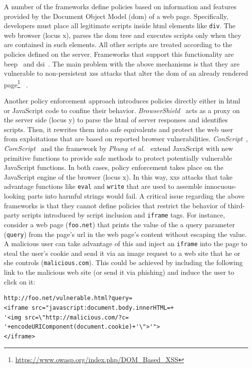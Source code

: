 \documentclass[conference]{IEEEtran}
\begin{document}
A number of the frameworks define policies
based on information and features provided by
the Document Object Model ({\sc dom}) of a web page.
Specifically, developers must place all legitimate
scripts inside {\sc html} elements like {\tt div}.
The web browser (locus {\sc x}), parses the
{\sc dom} tree and executes scripts only when they
are contained in such elements. All other scripts
are treated according to the policies defined
on the server. Frameworks that support this
functionality are {\sc beep}~\cite{TNH07}
and {\sc dsi}~\cite{NSS06}. The main problem with
the above mechanisms is that they are vulnerable
to non-persistent {\sc xss} attacks that alter
the {\sc dom} of an already rendered
page\footnote{\url{https://www.owasp.org/index.php/DOM_Based_XSS}}
~\cite{APKLM10}.

Another policy enforcement approach introduces
policies directly either in {\sc html} or JavaScript code
to confine their behavior. {\it BrowserShield}~\cite{RDWDE07}
acts as a proxy on the server side (locus {\sc y}) to
parse the {\sc html} of server responses and identifies
scripts. Then, it rewrites them into safe equivalents
and protect the web user from exploitations
that are based on reported browser vulnerabilities.
{\it ConScript}~\cite{ML10}, {\it CoreScript}~\cite{YCIS07}
and the framework by {\it Phung et al.}~\cite{PSC09}
extend JavaScript with new primitive functions to
provide safe methods to protect potentially vulnerable
JavaScript functions. In both cases, policy enforcement takes
place on the JavaScript engine of the browser (locus {\sc x}).
In this way, {\sc xxs} attacks that take advantage
functions like {\tt eval} and {\tt write} that are
used to assemble innocuous-looking parts into harmful
strings would fail. A critical issue regarding
the above frameworks is that they cannot
define policies that restrict the behavior of third-party
scripts introduced by script inclusion and {\tt iframe}
tags. For instance, consider a web page ({\tt foo.net})
that prints the value of the a query parameter ({\tt query})
from the page's {\sc url} in the web page's content
without escaping the value. A malicious user
can take advantage of this and inject an {\tt iframe}
into the page to steal the user's cookie and
send it via an image request to a web site
that he or she controls ({\tt malicious.com}).
This could be achieved by including the following
link to the malicious web site (or send it via phishing)
and induce the user to click on it:

\lstset{language=VBScript, basicstyle=\footnotesize\ttfamily,}
\begin{lstlisting}
http://foo.net/vulnerable.html?query=
<iframe src="javascript:document.body.innerHTML=+
'<img src=\"http://malicious.com/?c=
'+encodeURIComponent(document.cookie)+'\">'">
</iframe>
\end{lstlisting}
\end{document}
